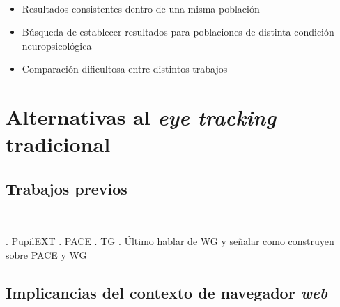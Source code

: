 \documentclass[aspectratio=169]{beamer}
\begin{document}
\begin{frame}{~}
    \begin{itemize}
    \item Resultados consistentes dentro de una misma población

    \item Búsqueda de establecer resultados para poblaciones de distinta condición neuropsicológica

    \item Comparación dificultosa entre distintos trabajos
    \end{itemize}

\end{frame}

\section{Alternativas al \textit{eye tracking} tradicional}

\subsection{Trabajos previos}

\begin{frame}{~}

. PupilEXT
. PACE
. TG
. Último hablar de WG y señalar como construyen sobre PACE y WG

\end{frame}

\subsection{Implicancias del contexto de navegador \textit{web}}
\end{document}
